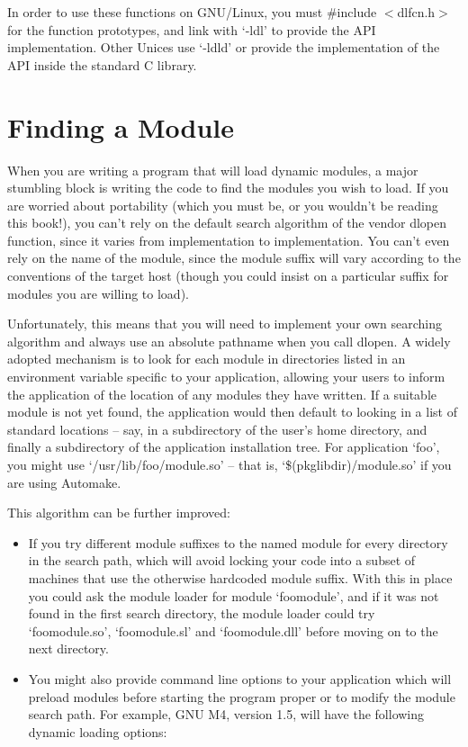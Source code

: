 In order to use these functions on GNU/Linux, you must \#include $<$dlfcn.h$>$ 
for the function prototypes, and link with `-ldl' to provide the API 
implementation. Other Unices use `-ldld' or provide the implementation of the 
API inside the standard C library.

\section{Finding a Module}

When you are writing a program that will load dynamic modules, a major stumbling block is writing the code to find the modules you wish to load. If you are worried about portability (which you must be, or you wouldn't be reading this book!), you can't rely on the default search algorithm of the vendor dlopen function, since it varies from implementation to implementation. You can't even rely on the name of the module, since the module suffix will vary according to the conventions of the target host (though you could insist on a particular suffix for modules you are willing to load).

Unfortunately, this means that you will need to implement your own searching 
algorithm and always use an absolute pathname when you call dlopen. A 
widely adopted mechanism is to look for each module in directories listed in 
an environment variable specific to your application, allowing your users to 
inform the application of the location of any modules they have written. If 
a suitable module is not yet found, the application would then default to 
looking in a list of standard locations -- say, in a subdirectory of the 
user's home directory, and finally a subdirectory of the application 
installation tree. For application `foo', you might 
use `/usr/lib/foo/module.so' -- that is, `\$(pkglibdir)/module.so' if you are 
using Automake.

This algorithm can be further improved: 

\begin{itemize}
\item If you try different module suffixes to the named module for every directory in the search path, which will avoid locking your code into a subset of machines that use the otherwise hardcoded module suffix. With this in place you could ask the module loader for module `foomodule', and if it was not found in the first search directory, the module loader could try `foomodule.so', `foomodule.sl' and `foomodule.dll' before moving on to the next directory.

\item You might also provide command line options to your application which will preload modules before starting the program proper or to modify the module search path. For example, GNU M4, version 1.5, will have the following dynamic loading options:
\end{itemize}

